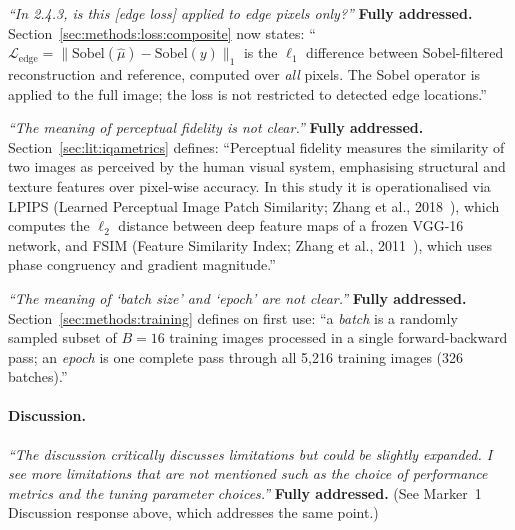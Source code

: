 \documentclass[12pt, a4paper, twoside, openright]{book}
\begin{document}
\begin{appendices}
\textit{``In 2.4.3, is this [edge loss] applied to edge pixels only?''}
\textbf{Fully addressed.} Section~\ref{sec:methods:loss:composite} now states: ``$\mathcal{L}_{\mathrm{edge}} = \|\mathrm{Sobel}(\hat{\mu}) - \mathrm{Sobel}(y)\|_1$ is the $\ell_1$ difference between Sobel-filtered reconstruction and reference, computed over \emph{all} pixels. The Sobel operator is applied to the full image; the loss is not restricted to detected edge locations.''

\textit{``The meaning of perceptual fidelity is not clear.''}
\textbf{Fully addressed.} Section~\ref{sec:lit:iqametrics} defines: ``Perceptual fidelity measures the similarity of two images as perceived by the human visual system, emphasising structural and texture features over pixel-wise accuracy. In this study it is operationalised via LPIPS (Learned Perceptual Image Patch Similarity; Zhang et al., 2018~\cite{zhang_unreasonable_2018}), which computes the $\ell_2$ distance between deep feature maps of a frozen VGG-16 network, and FSIM (Feature Similarity Index; Zhang et al., 2011~\cite{zhang_fsim_2011}), which uses phase congruency and gradient magnitude.''

\textit{``The meaning of `batch size' and `epoch' are not clear.''}
\textbf{Fully addressed.} Section~\ref{sec:methods:training} defines on first use: ``a \emph{batch} is a randomly sampled subset of $B=16$ training images processed in a single forward-backward pass; an \emph{epoch} is one complete pass through all 5,216 training images (326 batches).''

\paragraph{Discussion.}
\textit{``The discussion critically discusses limitations but could be slightly expanded. I see more limitations that are not mentioned such as the choice of performance metrics and the tuning parameter choices.''}
\textbf{Fully addressed.} (See Marker~1 Discussion response above, which addresses the same point.)

\end{appendices}

\end{document}
